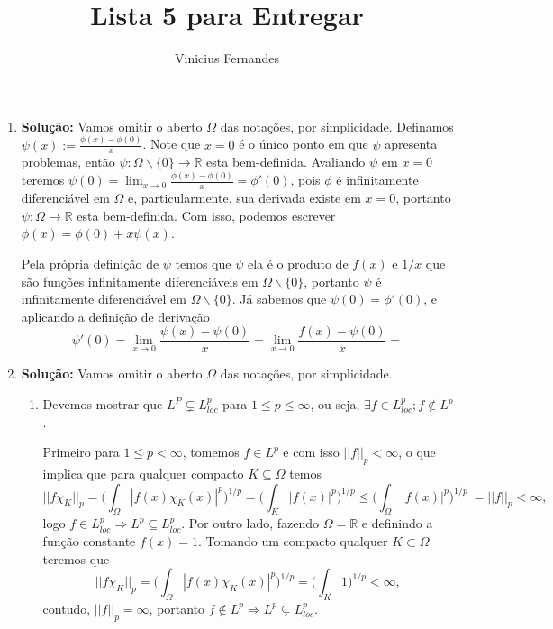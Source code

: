 \documentclass{article}
\begin{document}
	
	\title{Lista 5 para Entregar}
	\author{Vinicius Fernandes}
	
	\maketitle
	
	\begin{enumerate}
		
		\item \textbf{Solução:} Vamos omitir o aberto $\Omega$ das notações, por simplicidade. Definamos $\psi(x) := \frac{\phi(x) - \phi(0)}{x}$. Note que $x=0$ é o único ponto em que $\psi$ apresenta problemas, então $\psi:\Omega\backslash\{0\} \to \mathbb{R}$ esta bem-definida. Avaliando $\psi$ em $x=0$ teremos $\psi(0) = \lim_{x \to 0} \frac{\phi(x) - \phi(0)}{x} = \phi'(0)$, pois $\phi$ é infinitamente diferenciável em $\Omega$ e, particularmente, sua derivada existe em $x=0$, portanto $\psi:\Omega \to \mathbb{R}$ esta bem-definida. Com isso, podemos escrever $\phi(x) = \phi(0) + x \psi(x)$.
		
		
		Pela própria definição de $\psi$ temos que $\psi$ ela é o produto de $f(x)$ e $1/x$ que são funções infinitamente diferenciáveis em $\Omega \backslash\{0\}$, portanto $\psi$ é infinitamente diferenciável em $\Omega \backslash\{0\}$. Já sabemos que $\psi(0) = \phi'(0)$, e aplicando a definição de derivação 
		$$
		\psi'(0) = \lim_{x \to 0}\frac{\psi(x) - \psi(0)}{x} = \lim_{x \to 0}\frac{f(x) - \psi(0)}{x} = 
		$$ 
		
		\item \textbf{Solução:} Vamos omitir o aberto $\Omega$ das notações, por simplicidade.
		\begin{enumerate}
			\item Devemos mostrar que $L^{P} \subsetneq L^{p}_{loc}$ para $1 \leq p \leq \infty$, ou seja, $\exists f \in L^{p}_{loc}; f \notin L^{p}$. 
			
			Primeiro para $1 \leq p < \infty$, tomemos $f \in L^{p}$ e com isso $||f||_{p} < \infty$, o que implica que para qualquer compacto $K \subseteq \Omega$ temos 
			$$
			||f\chi_{K}||_{p} = \Big( \int_{\Omega}|f(x)\chi_{K} (x)|^{p} \Big)^{1/p}= \Big( \int_{K}|f(x)|^{p} \Big)^{1/p} \leq \Big( \int_{\Omega}|f(x)|^{p} \Big)^{1/p} \ = ||f||_{p} < \infty,
			$$
			logo $f \in L^{p}_{loc} \Rightarrow L^{p} \subseteq L^{p}_{loc}$. Por outro lado, fazendo $\Omega = \mathbb{R}$ e definindo a função constante $f(x) = 1$. Tomando um compacto qualquer $K \subset \Omega$ teremos que 
			$$
			||f \chi_{K}||_{p} = \Big( \int_{\Omega} |f(x)\chi_{K}(x)|^{p} \Big)^{1/p} = \Big( \int_{K} 1 \Big)^{1/p} < \infty,
			$$
			contudo, 
			$||f||_{p} = \infty$, portanto $f \notin L^{p} \Rightarrow L^{p} \subsetneq L^{p}_{loc}$.
			

\end{enumerate}
\end{enumerate}
\end{document}

